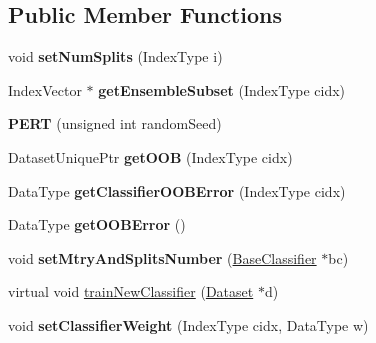 \subsection*{Public Member Functions}
\begin{DoxyCompactItemize}
\item 
\hypertarget{classffactory_1_1_p_e_r_t_a84126fe057ac1d5fefa7614e40e3c44f}{void {\bfseries set\-Num\-Splits} (Index\-Type i)}\label{classffactory_1_1_p_e_r_t_a84126fe057ac1d5fefa7614e40e3c44f}

\item 
\hypertarget{classffactory_1_1_p_e_r_t_ab8dc4c0ef0bb9e57a9566d228fae1a5c}{Index\-Vector $\ast$ {\bfseries get\-Ensemble\-Subset} (Index\-Type cidx)}\label{classffactory_1_1_p_e_r_t_ab8dc4c0ef0bb9e57a9566d228fae1a5c}

\item 
\hypertarget{classffactory_1_1_p_e_r_t_ab61dc93a09796cabcb768736b474936a}{{\bfseries P\-E\-R\-T} (unsigned int random\-Seed)}\label{classffactory_1_1_p_e_r_t_ab61dc93a09796cabcb768736b474936a}

\item 
\hypertarget{classffactory_1_1_p_e_r_t_a7219a3191f29d30e6433d75f2df34ef9}{Dataset\-Unique\-Ptr {\bfseries get\-O\-O\-B} (Index\-Type cidx)}\label{classffactory_1_1_p_e_r_t_a7219a3191f29d30e6433d75f2df34ef9}

\item 
\hypertarget{classffactory_1_1_p_e_r_t_a48231d3910da2008512a94105e2f5836}{Data\-Type {\bfseries get\-Classifier\-O\-O\-B\-Error} (Index\-Type cidx)}\label{classffactory_1_1_p_e_r_t_a48231d3910da2008512a94105e2f5836}

\item 
\hypertarget{classffactory_1_1_p_e_r_t_a2743aa5746c5b37330fab7b1c0e19cfd}{Data\-Type {\bfseries get\-O\-O\-B\-Error} ()}\label{classffactory_1_1_p_e_r_t_a2743aa5746c5b37330fab7b1c0e19cfd}

\item 
\hypertarget{classffactory_1_1_p_e_r_t_a7307eec8f7846531f824ca22faec9ae8}{void {\bfseries set\-Mtry\-And\-Splits\-Number} (\hyperlink{classffactory_1_1_base_classifier}{Base\-Classifier} $\ast$bc)}\label{classffactory_1_1_p_e_r_t_a7307eec8f7846531f824ca22faec9ae8}

\item 
virtual void \hyperlink{classffactory_1_1_p_e_r_t_a17f2d0a156cb207384e4bb31263ca922}{train\-New\-Classifier} (\hyperlink{classffactory_1_1_dataset}{Dataset} $\ast$d)
\item 
\hypertarget{classffactory_1_1_p_e_r_t_a5ba25ed09280bc086ac27c24a8a881f3}{void {\bfseries set\-Classifier\-Weight} (Index\-Type cidx, Data\-Type w)}\label{classffactory_1_1_p_e_r_t_a5ba25ed09280bc086ac27c24a8a881f3}


\end{DoxyCompactItemize}
